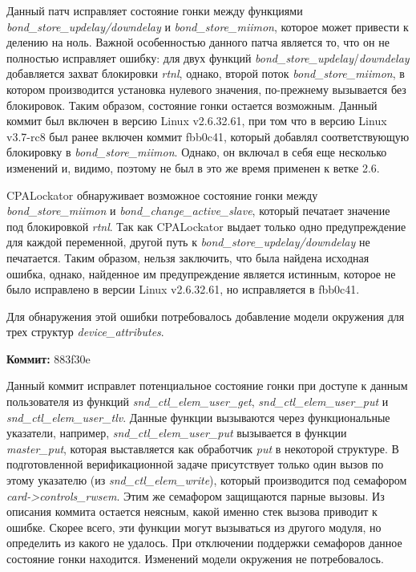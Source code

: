Данный патч исправляет состояние гонки между функциями \textit{bond\_store\_updelay/downdelay}
и \textit{bond\_store\_miimon}, которое может привести к делению на ноль.
Важной особенностью данного патча является то, что он не полностью исправляет ошибку: для двух функций \textit{bond\_store\_updelay}/\textit{downdelay} добавляется захват блокировки \textit{rtnl}, однако, второй поток \textit{bond\_store\_miimon}, в котором производится установка нулевого значения, по-прежнему вызывается без блокировок.
Таким образом, состояние гонки остается возможным.
Данный коммит был включен в версию Linux v2.6.32.61, при том что в версию Linux v3.7-rc8 был ранее включен коммит fbb0c41, который добавлял соответствующую блокировку в \textit{bond\_store\_miimon}.
Однако, он включал в себя еще несколько изменений и, видимо, поэтому не был в это же время применен к ветке 2.6.

CPALockator обнаруживает возможное состояние гонки между \textit{bond\_store\_miimon} и \textit{bond\_change\_active\_slave}, который печатает значение под блокировкой \textit{rtnl}.
Так как CPALockator выдает только одно предупреждение для каждой переменной, другой путь к \textit{bond\_store\_updelay/downdelay} не печатается.
Таким образом, нельзя заключить, что была найдена исходная ошибка, однако, найденное им предупреждение является истинным, которое не было исправлено в версии Linux v2.6.32.61, но исправляется в fbb0c41.

Для обнаружения этой ошибки потребовалось добавление модели окружения для трех структур \textit{device\_attributes}.

\vspace{1cm}

\textbf{Коммит:} 883f30e

Данный коммит исправлет потенциальное состояние гонки при доступе к данным пользователя из функций \textit{snd\_ctl\_elem\_user\_get}, \textit{snd\_ctl\_elem\_user\_put} и \textit{snd\_ctl\_elem\_user\_tlv}.
Данные функции вызываются через функциональные указатели, например, \textit{snd\_ctl\_elem\_user\_put} вызывается в функции \textit{master\_put}, которая выставляется как обработчик \textit{put} в некоторой структуре. 
В подготовленной верификационной задаче присутствует только один вызов по этому указателю (из \textit{snd\_ctl\_elem\_write}), который производится под семафором \textit{card->controls\_rwsem}.
Этим же семафором защищаются парные вызовы.
Из описания коммита остается неясным, какой именно стек вызова приводит к ошибке.
Скорее всего, эти функции могут вызываться из другого модуля, но определить из какого не удалось.
При отключении поддержки семафоров данное состояние гонки находится.
Изменений модели окружения не потребовалось.

